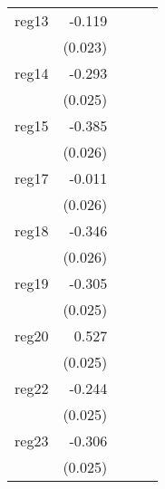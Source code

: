 {\begin{longtable}{l*{4}{D{.}{.}{-1}}}
\addlinespace
reg13       &      -0.119\sym{***}&                     &                     &                     \\
            &     (0.023)         &                     &                     &                     \\
\addlinespace
reg14       &      -0.293\sym{***}&                     &                     &                     \\
            &     (0.025)         &                     &                     &                     \\
\addlinespace
reg15       &      -0.385\sym{***}&                     &                     &                     \\
            &     (0.026)         &                     &                     &                     \\
\addlinespace
reg17       &      -0.011         &                     &                     &                     \\
            &     (0.026)         &                     &                     &                     \\
\addlinespace
reg18       &      -0.346\sym{***}&                     &                     &                     \\
            &     (0.026)         &                     &                     &                     \\
\addlinespace
reg19       &      -0.305\sym{***}&                     &                     &                     \\
            &     (0.025)         &                     &                     &                     \\
\addlinespace
reg20       &       0.527\sym{***}&                     &                     &                     \\
            &     (0.025)         &                     &                     &                     \\
\addlinespace
reg22       &      -0.244\sym{***}&                     &                     &                     \\
            &     (0.025)         &                     &                     &                     \\
\addlinespace
reg23       &      -0.306\sym{***}&                     &                     &                     \\
            &     (0.025)         &                     &                     &                     \\

\end{longtable}}
